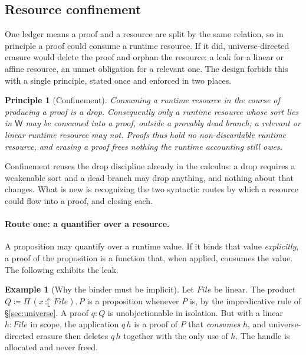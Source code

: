 \documentclass[11pt]{article}
\newcommand{\Wk}{\mathsf{W}}
\newcommand{\ex}{\mathsf{e}}                      %
\newcommand{\bind}[3]{#1\,{:}^{#2}_{#3}\,}        %
\newcommand{\Pifn}[4]{\Pi\,(\bind{#1}{#2}{#3}#4).\,}
\theoremstyle{definition}
\newtheorem{example}[definition]{Example}
\theoremstyle{plain}
\newtheorem{principle}[definition]{Principle}
\begin{document}
\subsection{Resource confinement}

One ledger means a proof and a resource are split by the same relation, so in
principle a proof could consume a runtime resource. If it did, universe-directed
erasure would delete the proof and orphan the resource: a leak for a linear or
affine resource, an unmet obligation for a relevant one. The design forbids this
with a single principle, stated once and enforced in two places.

\begin{principle}[Confinement]\label{prin:confine}
Consuming a runtime resource in the course of producing a proof is a
\emph{drop}. Consequently only a runtime resource whose sort lies in $\Wk$ may be
consumed into a proof, outside a provably dead branch; a relevant or linear
runtime resource may not. Proofs thus hold no non-discardable runtime resource,
and erasing a proof frees nothing the runtime accounting still owes.
\end{principle}

Confinement reuses the drop discipline already in the calculus: a drop requires a
weakenable sort and a dead branch may drop anything, and nothing about that
changes. What is new is recognizing the two syntactic routes by which a resource
could flow into a proof, and closing each.

\paragraph{Route one: a quantifier over a resource.}
A proposition may quantify over a runtime value. If it binds that value
\emph{explicitly}, a proof of the proposition is a function that, when applied,
consumes the value. The following exhibits the leak.

\begin{example}[Why the binder must be implicit]\label{ex:leak}
Let $\mathit{File}$ be linear. The product $Q \coloneqq \Pifn{x}{\ex}{\mathsf{L}}{\mathit{File}}P$
is a proposition whenever $P$ is, by the impredicative rule of
\S\ref{sec:universe}. A proof $q:Q$ is unobjectionable in isolation. But with a
linear $h:\mathit{File}$ in scope, the application $q\,h$ is a proof of $P$ that
\emph{consumes} $h$, and universe-directed erasure then deletes $q\,h$ together with
the only use of $h$. The handle is allocated and never freed.
\end{example}
\end{document}
